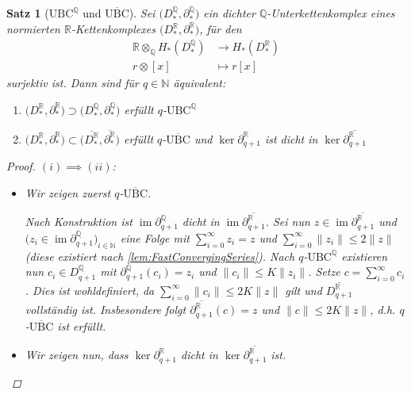 \documentclass[a4paper,twoside,10pt]{scrreprt}
\DeclareMathOperator{\img}{im}
\newcommand{\UBC}{\text{UBC}}
\newcommand{\N}{\mathbb{N}}
\newcommand{\Q}{\mathbb{Q}}
\newcommand{\R}{\mathbb{R}}
\newtheorem{satz}{Satz}[section]
\theoremstyle{definition}
\begin{document}
\begin{satz}[$\UBC^{\Q}$ und $\overline{\UBC}$]\label{satz:UBCandDenseQSubcomplexes}
Sei $\bigl(D_*^{\Q},\partial_*^{\Q}\bigr)$ ein dichter $\Q$-Unterkettenkomplex eines normierten $\R$-Kettenkomplexes $\bigl(D_*^{\R},\partial_*^{\R}\bigr)$, für den
\begin{align*}
\R\otimes_{\Q}H_*(D_*^{\Q})&\to H_*(D_*^{\R})\\
r\otimes [x] &\mapsto r[x]
\end{align*}
surjektiv ist. Dann sind für $q\in\N$ äquivalent:
\renewcommand{\labelenumi}{(\roman{enumi})}%
\begin{enumerate}
\item $\bigl(D_*^{\R},\partial_*^{\R}\bigr)\supset \bigl(D_*^{\Q},\partial_*^{\Q}\bigr)$ erfüllt $q$-$\text{UBC}^{\Q}$
\item $\bigl(D_*^{\R},\partial_*^{\R}\bigr)\subset\bigl(\overline{D_*^{\R}},\overline{\partial_*^{\R}}\bigr)$ erfüllt $q$-$\overline{\text{UBC}}$ und $\ker \partial_{q+1}^{\R}$ ist dicht in $\ker \overline{\partial_{q+1}^{\R}}$
\end{enumerate}
\begin{proof}
$(i)\implies (ii)$:\par
\begin{itemize}
\item Wir zeigen zuerst $q$-$\overline{\UBC}$.\par
Nach Konstruktion ist $\img \partial_{q+1}^{\Q}$ dicht in $\img \overline{\partial_{q+1}^{\R}}$. Sei nun $z\in \img \overline{\partial_{q+1}^{\R}}$ und $\bigl(z_i\in \img \partial_{q+1}^{\Q}\bigr)_{i\in \N}$ eine Folge mit $\sum\limits_{i=0}^{\infty}z_i=z$ und $\sum\limits_{i=0}^{\infty}\|z_i\|\leq 2\|z\|$ (diese existiert nach \cref{lem:FastConvergingSeries}). 
Nach $q$-$\UBC^{\Q}$ existieren nun $c_i\in D_{q+1}^{\Q}$ mit $\partial_{q+1}^{\Q}(c_i)=z_i$ und $\|c_i\|\leq K\|z_i\|$. Setze $c=\sum\limits_{i=0}^{\infty}c_i$. Dies ist wohldefiniert, da $\sum\limits_{i=0}^{\infty}\|c_i\|\leq 2K\|z\|$ gilt und $\overline{D_{q+1}^{\R}}$ vollständig ist. Insbesondere folgt $\overline{\partial_{q+1}^{\R}}(c)=z$ und $\|c\|\leq 2K\|z\|$, d.h. $q$-$\overline{\UBC}$ ist erfüllt.\par
\item Wir zeigen nun, dass $\ker \partial_{q+1}^{\R}$ dicht in $\ker \overline{\partial_{q+1}^{\R}}$ ist.\par

\end{itemize}
\end{proof}
\end{satz}
\end{document}
